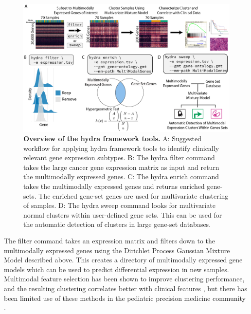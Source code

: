\documentclass[10pt,letterpaper]{article}
\begin{document}
\begin{figure}[h!]
	\includegraphics[width=\textwidth]{"img/overview-fig"}
	\caption{{\bf Overview of the hydra framework tools.}
		A: Suggested workflow for applying hydra framework tools to identify clinically relevant gene expression subtypes. B: The hydra filter command takes the large cancer gene expression matrix as input and return the multimodally expressed genes. C: The hydra enrich command takes the multimodally expressed genes and returns enriched gene-sets. The enriched gene-set genes are used for multivariate clustering of samples. D: The hydra sweep command looks for multivariate normal clusters within user-defined gene sets. This can be used for the automatic detection of clusters in large gene-set databases.
		\label{overview}}
\end{figure}

The filter command takes an expression matrix and filters down to the multimodally expressed genes using the Dirichlet Process Gaussian Mixture Model described above. This creates a directory of multimodally expressed gene models which can be used to predict differential expression in new samples. Multimodal feature selection has been shown to improve clustering performance, and the resulting clustering correlates better with clinical features \cite{yiliMultimodalityCriterionFeature2005}, but there has been limited use of these methods in the pediatric precision medicine community \cite{modyIntegrativeClinicalSequencing2015, worstNextgenerationPersonalisedMedicine2016, obergImplementationNextGeneration2016}. 
\end{document}
